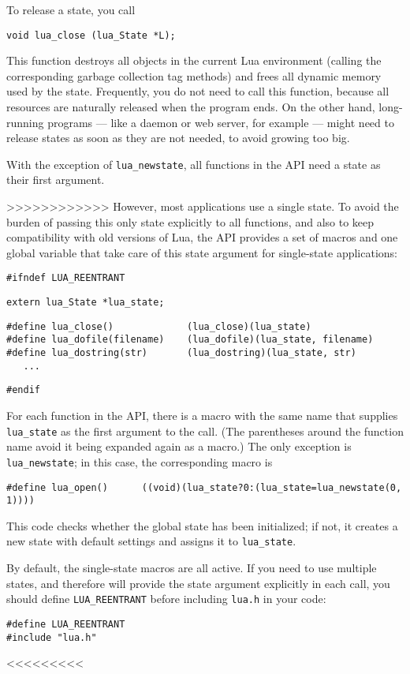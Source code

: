 \documentclass[11pt]{article}
\newcommand{\T}[1]{{\tt #1}}
\newcommand{\IndexVerb}[1]{\T{#1}\index{#1}}
\begin{document}
To release a state, you call
\begin{verbatim}
void lua_close (lua_State *L);
\end{verbatim}
This function destroys all objects in the current Lua environment
(calling the corresponding garbage collection tag methods)
and frees all dynamic memory used by the state.
Frequently, you do not need to call this function,
because all resources are naturally released when the program ends.
On the other hand,
long-running programs ---
like a daemon or web server, for example ---
might need to release states as soon as they are not needed,
to avoid growing too big.

With the exception of \verb|lua_newstate|,
all functions in the API need a state as their first argument.

>>>>>>>>>>>>
However, most applications use a single state.
To avoid the burden of passing this only state explicitly to all
functions, and also to keep compatibility with old versions of Lua,
the API provides a set of macros and one global variable that
take care of this state argument for single-state applications:
\begin{verbatim}
#ifndef LUA_REENTRANT
\end{verbatim}
\begin{verbatim}
extern lua_State *lua_state;
\end{verbatim}
\begin{verbatim}
#define lua_close()             (lua_close)(lua_state)
#define lua_dofile(filename)    (lua_dofile)(lua_state, filename)
#define lua_dostring(str)       (lua_dostring)(lua_state, str)
   ...
\end{verbatim}
\begin{verbatim}
#endif
\end{verbatim}
For each function in the API, there is a macro with the same name
that supplies \verb|lua_state| as the first argument to the call.
(The parentheses around the function name avoid it being expanded
again as a macro.)
The only exception is \verb|lua_newstate|;
in this case, the corresponding macro is
\begin{verbatim}
#define lua_open()      ((void)(lua_state?0:(lua_state=lua_newstate(0, 1))))
\end{verbatim}
This code checks whether the global state has been initialized;
if not, it creates a new state with default settings and
assigns it to \verb|lua_state|.

By default, the single-state macros are all active.
If you need to use multiple states,
and therefore will provide the state argument explicitly in each call,
you should define \IndexVerb{LUA_REENTRANT} before
including \verb|lua.h| in your code:
\begin{verbatim}
#define LUA_REENTRANT
#include "lua.h"
\end{verbatim}
<<<<<<<<<
\end{document}
